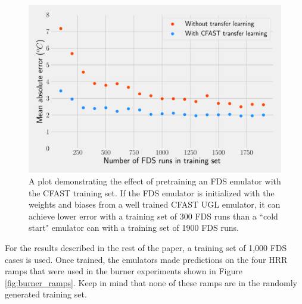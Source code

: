 \documentclass{article}
\begin{document}
\begin{figure}[htb] \centering
\includegraphics[width=.75\textwidth]{./figures/transfer_learning_effect.pdf}
\caption{A plot demonstrating the effect of pretraining an FDS emulator with the CFAST training set. If the FDS emulator is initialized with the weights and biases from a well trained CFAST UGL emulator, it can achieve lower error with a training set of 300 FDS runs than a ``cold start" emulator can with a training set of 1900 FDS runs.}
\label{fig:transfer_learning}
\end{figure}

For the results described in the rest of the paper, a training set of 1,000 FDS cases is used. Once trained, the emulators made predictions on the four HRR ramps that were used in the burner experiments shown in Figure \ref{fig:burner_ramps}. Keep in mind that none of these ramps are in the randomly generated training set. 
\end{document}

